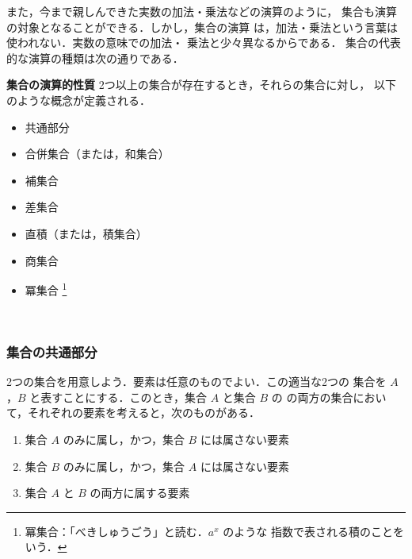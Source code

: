                 また，今まで親しんできた実数の加法・乗法などの演算のように，
                集合も演算の対象となることができる．しかし，集合の演算
                は，加法・乗法という言葉は使われない．実数の意味での加法・
                乗法と少々異なるからである．
                集合の代表的な演算の種類は次の通りである．
                \\
                \begin{itembox}[l]{\textbf{集合の演算的性質}}
                    2つ以上の集合が存在するとき，それらの集合に対し，
                    以下のような概念が定義される．
                        \begin{itemize}
                            \item 共通部分
                            \item 合併集合（または，和集合）
                            \item 補集合
                            \item 差集合
                            \item 直積（または，積集合）
                            \item 商集合
                            \item 冪集合
                                \footnote{
                                    冪集合：「べきしゅうごう」と読む．$a^{x}$ のような
                                    指数で表される積のことをいう．
                                }
                        \end{itemize}
                \end{itembox}
                \\



                \subsubsection{集合の共通部分}
                    2つの集合を用意しよう．要素は任意のものでよい．この適当な2つの
                    集合を $A$，$B$ と表すことにする．このとき，集合 $A$ と集合 $B$ の
                    の両方の集合において，それぞれの要素を考えると，次のものがある．
                        \begin{enumerate}
                            \item 集合 $A$ のみに属し，かつ，集合 $B$ には属さない要素
                            \item 集合 $B$ のみに属し，かつ，集合 $A$ には属さない要素
                            \item 集合 $A$ と $B$ の両方に属する要素
                        \end{enumerate}


